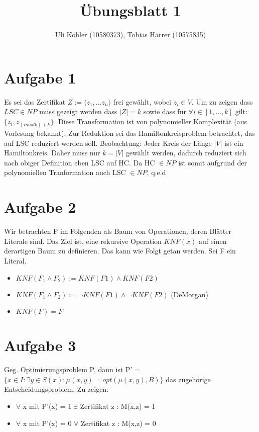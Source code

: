 \documentclass[a4paper,10pt,oneside,leqno]{scrartcl}
\title{Übungsblatt 1}
\author{Uli Köhler (10580373), Tobias Harrer (10575835)}
\begin{document}
\maketitle
\section*{Aufgabe 1}%
Es sei das Zertifikat $Z := \langle z_1,...z_n\rangle$ frei gewählt, wobei $z_i \in V$.
Um zu zeigen dass $LSC \in NP$ muss gezeigt werden dass $|Z| = k$ sowie dass für $\forall i \in [1,...,k]$ gilt:
$\{z_i,z_{(i mod k) + k}\}$. Diese Transformation ist von polynomieller Komplexität (aus Vorlesung bekannt).
Zur Reduktion sei das Hamiltonkreisproblem betrachtet, das auf LSC reduziert werden soll.
Beobachtung: Jeder Kreis der Länge $|V|$ ist ein Hamiltonkreis. Daher muss nur $k = |V|$ gewählt werden, dadurch reduziert sich nach obiger Definition eben LSC auf HC. Da HC $\in NP$ ist somit aufgrund der polynomiellen Tranformation auch LSC $\in NP$, q.e.d

\section*{Aufgabe 2}%
Wir betrachten F im Folgenden als Baum von Operationen, deren Blätter Literale sind.
Das Ziel ist, eine rekursive Operation $KNF(x)$ auf einen derartigen Baum zu definieren. Das kann wie Folgt getan werden. Sei F ein Literal.
\begin{itemize}
 \item $KNF(F_1 \wedge F_2) := KNF(F1) \wedge KNF(F2)$
 \item $KNF(F_1 \wedge F_2) := \neg KNF(F1) \wedge \neg KNF(F2)$ (DeMorgan)
 \item $KNF(F) = F$
\end{itemize}

\section*{Aufgabe 3}%
Geg. Optimierungsproblem P, dann ist P' = $\{x \in I : \exists y \in S(x) : \mu(x, y) = opt(\mu(x, y), B)\}$ das zugehörige Entscheidungsproblem. \newline
Zu zeigen: \begin{itemize}
     \item $\forall$ x mit P'(x) = 1 $\exists$ Zertifikat z : M(x,z) = 1
     \item $\forall$ x mit P'(x) = 0 $\forall$ Zertifikat z : M(x,z) = 0
    \end{itemize}
    
\end{document}
